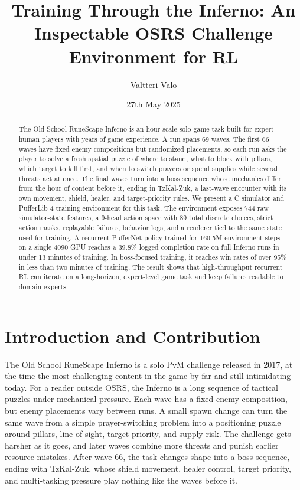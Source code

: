 \documentclass[10pt]{article}
\title{\vspace{-1.2em}Training Through the Inferno: An Inspectable OSRS Challenge Environment for RL\vspace{-0.4em}}
\author{Valtteri Valo}
\date{27th May 2025}
\begin{document}
\maketitle
\vspace{-1.8em}

\begin{abstract}
The Old School RuneScape Inferno is an hour-scale solo game task built for expert human players with years of game experience. A run spans 69 waves. The first 66 waves have fixed enemy compositions but randomized placements, so each run asks the player to solve a fresh spatial puzzle of where to stand, what to block with pillars, which target to kill first, and when to switch prayers or spend supplies while several threats act at once. The final waves turn into a boss sequence whose mechanics differ from the hour of content before it, ending in TzKal-Zuk, a last-wave encounter with its own movement, shield, healer, and target-priority rules. We present a C simulator and PufferLib 4 training environment for this task. The environment exposes 744 raw simulator-state features, a 9-head action space with 89 total discrete choices, strict action masks, replayable failures, behavior logs, and a renderer tied to the same state used for training. A recurrent PufferNet policy trained for 160.5M environment steps on a single 4090 GPU reaches a 39.8\% logged completion rate on full Inferno runs in under 13 minutes of training. In boss-focused training, it reaches win rates of over 95\% in less than two minutes of training. The result shows that high-throughput recurrent RL can iterate on a long-horizon, expert-level game task and keep failures readable to domain experts.
\end{abstract}

\section{Introduction and Contribution}



The Old School RuneScape Inferno is a solo PvM challenge released in 2017, at the time the most challenging content in the game by far and still intimidating today. For a reader outside OSRS, the Inferno is a long sequence of tactical puzzles under mechanical pressure. Each wave has a fixed enemy composition, but enemy placements vary between runs. A small spawn change can turn the same wave from a simple prayer-switching problem into a positioning puzzle around pillars, line of sight, target priority, and supply risk. The challenge gets harsher as it goes, and later waves combine more threats and punish earlier resource mistakes. After wave 66, the task changes shape into a boss sequence, ending with TzKal-Zuk, whose shield movement, healer control, target priority, and multi-tasking pressure play nothing like the waves before it.
\end{document}
